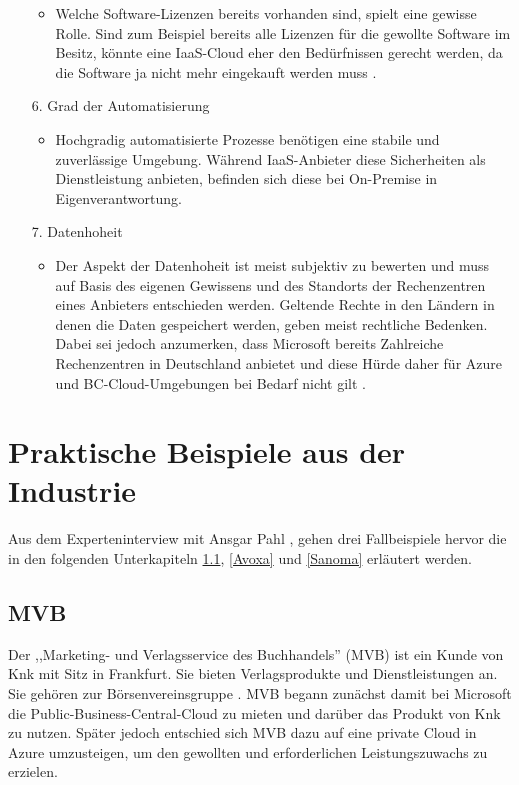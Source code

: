 \documentclass[12pt,bibtotoc]{article}
\begin{document}
\begin{itemize}
				\begin{itemize}
					\item Welche Software-Lizenzen bereits vorhanden sind, spielt eine gewisse Rolle. Sind zum Beispiel bereits alle Lizenzen für die gewollte Software im Besitz, könnte eine IaaS-Cloud eher den Bedürfnissen gerecht werden, da die Software ja nicht mehr eingekauft werden muss \cite{Anhang}.
				\end{itemize}
			\item[6.] Grad der Automatisierung
				\begin{itemize}
					\item Hochgradig automatisierte Prozesse benötigen eine stabile und zuverlässige Umgebung. Während IaaS-Anbieter diese Sicherheiten als Dienstleistung anbieten, befinden sich diese bei On-Premise in Eigenverantwortung. 
				\end{itemize}
			\item[7.] Datenhoheit 
				\begin{itemize}
					\item Der Aspekt der Datenhoheit ist meist subjektiv zu bewerten und muss auf Basis des eigenen Gewissens und des Standorts der Rechenzentren eines Anbieters entschieden werden. Geltende Rechte in den Ländern in denen die Daten gespeichert werden, geben meist rechtliche Bedenken. Dabei sei jedoch anzumerken, dass Microsoft bereits Zahlreiche Rechenzentren in Deutschland anbietet und diese Hürde daher für Azure und BC-Cloud-Umgebungen bei Bedarf nicht gilt \cite{Microsoft-Rechenzentrum.2023}.
				\end{itemize}
		\end{itemize}
		\newpage
	\section{Praktische Beispiele aus der Industrie}
		Aus dem Experteninterview mit Ansgar Pahl \cite{Anhang}, gehen drei Fallbeispiele hervor die in den folgenden Unterkapiteln \ref{MVB}, \ref{Avoxa} und \ref{Sanoma} erläutert werden.
			\subsection{MVB}\label{MVB}
			Der ,,Marketing- und Verlagsservice des Buchhandels'' (MVB) ist ein Kunde von Knk mit Sitz in Frankfurt. Sie bieten Verlagsprodukte und Dienstleistungen an. Sie gehören zur Börsenvereinsgruppe \cite{MVB-Website.2024}.\newline 
			MVB begann zunächst damit bei Microsoft die Public-Business-Central-Cloud zu mieten und darüber das Produkt von Knk zu nutzen. Später jedoch entschied sich MVB dazu auf eine private Cloud in Azure umzusteigen, um den gewollten und erforderlichen Leistungszuwachs zu erzielen.
\end{document}
